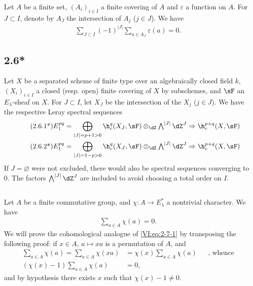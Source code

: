 Let $A$ be a finite set, $(A_i)_{i\in I}$ a finite covering of $A$ and 
$\varepsilon$ a function on $A$. For $J\subset I$, denote by $A_J$ 
the intersection of $A_j$ ($j\in J$). We have 
\begin{align*}\tag{2.6.1}\label{VI:eq:2-6-1}
  \sum_{J\subset I} (-1)^{|J|} \sum_{a\in A_J} \varepsilon(a) = 0 \text{.}
\end{align*}





\subsection*{2.6*}\label{VI:2-6*}

Let $X$ be a separated scheme of finite type over an algebraically closed field $k$, 
$(X_i)_{i\in I}$ a closed (resp. open) finite covering of $X$ by 
subschemes, and $\sF$ an $E_\lambda$-sheaf on $X$. For $J\subset I$, 
let $X_J$ be the intersection of the $X_j$ ($j\in J$). We have the respective 
Leray spectral sequences 
\begin{align*}\tag{2.6.1*}\label{VI:eq:2-6-1*}
  E_1^{p q} &= \bigoplus_{|J|=p+1>0} \h_c^q(X_J,\sF) \otimes_\dZ \textstyle\bigwedge^{|J|} \dZ^J \Rightarrow \h_c^{p+q}(X,\sF) \\ 
  \tag{2.6.2*}\label{VI:eq:2-6-2*}
  E_1^{p q} &= \bigoplus_{|J|=1-p>0} \h_c^q(X_J,\sF) \otimes_\dZ \textstyle\bigwedge^{|J|} \dZ^J \Rightarrow \h_c^{p+q}(X,\sF)
\end{align*}
If $J=\varnothing$ were not excluded, there would also be spectral 
sequences converging to $0$. The factors $\bigwedge^{|J|} \dZ^J$ are included 
to avoid choosing a total order on $I$. 





\subsection{}\label{VI:2-7}

Let $A$ be a finite commutative group, and $\chi:A \to E_\lambda^\ast$ a 
nontrivial character. We have 
\begin{align*}\tag{2.7.1}\label{VI:eq:2-7-1}
  \sum_{a\in A} \chi(a) = 0 \text{.}
\end{align*}
We will prove the cohomological analogue of \eqref{VI:eq:2-7-1} by transposing 
the following proof: if $x\in A$, $a\mapsto x a$ is a permutation of $A$, and 
\begin{align*}
  \sum_{a\in A}\chi(a) = \sum_{a\in A} \chi(x a) &= \chi(x) \sum_{a\in A} \chi(a) && \text{, whence} \\
  (\chi(x)-1)\sum_{a\in A}\chi(a) &= 0 \text{,}
\end{align*}
and by hypothesis there exists $x$ such that $\chi(x)-1\ne 0$. 





